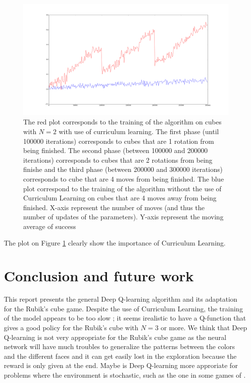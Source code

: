 \documentclass{article} %
\begin{document}
\begin{figure}[h]
\begin{center}
   \includegraphics[scale=0.23]{firstfigure.png}
   \caption{\label{firstfigure} The red plot corresponds to the training of the algorithm on cubes with $N=2$ with use of curriculum learning. The first phase (until 100000 iterations) corresponds to cubes that are 1 rotation from being finished. The second phase (between 100000 and 200000 iterations) corresponds to cubes that are 2 rotations from being finishe and the third phase (between 200000 and 300000 iterations) corresponds to cube that are 4 moves from being finished. The blue plot correspond to the training of the algorithm without the use of Curriculum Learning on cubes that are 4 moves away from being finished. X-axis represent the number of moves (and thus the number of updates of the parameters). Y-axis represent the moving average of success}
   \end{center}
\end{figure}

The plot on Figure \ref{firstfigure} clearly show the importance of Curriculum Learning.


\section{Conclusion and future work}
This report presents the general Deep Q-learning algorithm and its adaptation for the Rubik's cube game. Despite the use of Curriculum Learning, the training of the model appears to be too slow ; it seems irealistic to have a Q-function that gives a good policy for the Rubik's cube with $N=3$ or more. We think that Deep Q-learning is not very appropriate for the Rubik's cube game as the neural network will have much troubles to generalize the patterns between the colors and the different faces and it can get easily lost in the exploration because the reward is only given at the end. Maybe is Deep Q-learning more approriate for problems where the environment is stochastic, such as the one in some games of \cite{deepmind}.
\end{document}
